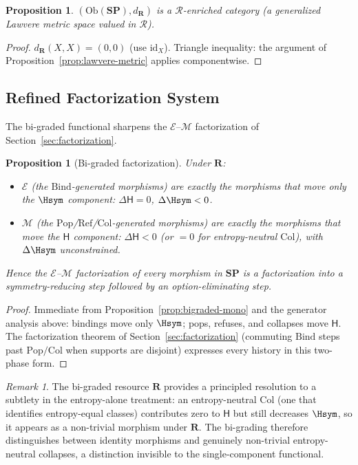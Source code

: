 \documentclass[12pt,a4paper]{article}
\newtheorem{proposition}[theorem]{Proposition}
\theoremstyle{definition}
\theoremstyle{remark}
\newtheorem{remark}[theorem]{Remark}
\newcommand{\Ent}{\ensuremath{\mathsf{H}}}
\newcommand{\SP}{\mathbf{SP}}
\newcommand{\Ob}{\mathrm{Ob}}
\providecommand{\id}{\mathrm{id}}
\renewcommand{\id}{\mathrm{id}}
\newcommand{\Pop}{\ensuremath{\mathrm{Pop}}}
\newcommand{\RefOp}{\ensuremath{\mathrm{Ref}}}
\newcommand{\Bind}{\ensuremath{\mathrm{Bind}}}
\newcommand{\Col}{\ensuremath{\mathrm{Col}}}
\begin{document}
\begin{proposition}
$(\Ob(\SP),d_{\mathbf{R}})$ is a $\mathcal{R}$-enriched category (a generalized
Lawvere metric space valued in $\mathcal{R}$).
\end{proposition}

\begin{proof}
$d_{\mathbf{R}}(X,X)=(0,0)$ (use $\id_X$). Triangle inequality: the argument of
Proposition~\ref{prop:lawvere-metric} applies componentwise.
\end{proof}

\subsection{Refined Factorization System}

The bi-graded functional sharpens the $\mathcal{E}$--$\mathcal{M}$ factorization of
Section~\ref{sec:factorization}.

\begin{proposition}[Bi-graded factorization]
\label{prop:bigraded-factor}
Under $\mathbf{R}$:
\begin{itemize}
  \item $\mathcal{E}$ (the $\Bind$-generated morphisms) are exactly the morphisms
    that move only the $\Hsym$ component: $\Delta\Ent=0$, $\Delta\Hsym<0$.
  \item $\mathcal{M}$ (the $\Pop$/$\RefOp$/$\Col$-generated morphisms) are exactly
    the morphisms that move the $\Ent$ component: $\Delta\Ent<0$ (or $=0$ for
    entropy-neutral $\Col$), with $\Delta\Hsym$ unconstrained.
\end{itemize}
Hence the $\mathcal{E}$--$\mathcal{M}$ factorization of every morphism in $\SP$ is
a factorization into a \emph{symmetry-reducing} step followed by an
\emph{option-eliminating} step.
\end{proposition}

\begin{proof}
Immediate from Proposition~\ref{prop:bigraded-mono} and the generator analysis above:
bindings move only $\Hsym$; pops, refuses, and collapses move $\Ent$. The factorization
theorem of Section~\ref{sec:factorization} (commuting $\Bind$ steps past $\Pop/\Col$
when supports are disjoint) expresses every history in this two-phase form.
\end{proof}

\begin{remark}
The bi-graded resource $\mathbf{R}$ provides a principled resolution to a subtlety
in the entropy-alone treatment: an entropy-neutral $\Col$ (one that identifies
entropy-equal classes) contributes zero to $\Ent$ but still decreases $\Hsym$,
so it appears as a non-trivial morphism under $\mathbf{R}$. The bi-grading therefore
distinguishes between identity morphisms and genuinely non-trivial entropy-neutral
collapses, a distinction invisible to the single-component functional.
\end{remark}
\end{document}
